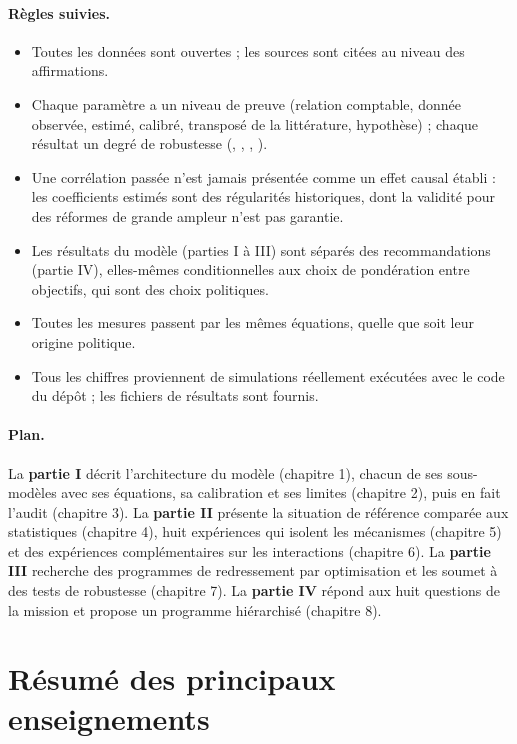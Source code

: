 \paragraph{Règles suivies.}
\begin{itemize}
\item Toutes les données sont ouvertes ; les sources sont citées au niveau des affirmations.
\item Chaque paramètre a un niveau de preuve (relation comptable, donnée observée, estimé, calibré, transposé de la
littérature, hypothèse) ; chaque résultat un degré de robustesse (, , ,
).
\item Une corrélation passée n'est jamais présentée comme un effet causal établi : les coefficients estimés sont des
régularités historiques, dont la validité pour des réformes de grande ampleur n'est pas garantie.
\item Les résultats du modèle (parties I à III) sont séparés des recommandations (partie IV), elles-mêmes conditionnelles
aux choix de pondération entre objectifs, qui sont des choix politiques.
\item Toutes les mesures passent par les mêmes équations, quelle que soit leur origine politique.
\item Tous les chiffres proviennent de simulations réellement exécutées avec le code du dépôt ; les fichiers de résultats
sont fournis.
\end{itemize}

\paragraph{Plan.} La \textbf{partie I} décrit l'architecture du modèle (chapitre 1), chacun de ses sous-modèles avec ses
équations, sa calibration et ses limites (chapitre 2), puis en fait l'audit (chapitre 3). La \textbf{partie II} présente
la situation de référence comparée aux statistiques (chapitre 4), huit expériences qui isolent les mécanismes
(chapitre 5) et des expériences complémentaires sur les interactions (chapitre 6). La \textbf{partie III} recherche des
programmes de redressement par optimisation et les soumet à des tests de robustesse (chapitre 7). La \textbf{partie IV}
répond aux huit questions de la mission et propose un programme hiérarchisé (chapitre 8).

\section*{Résumé des principaux enseignements}

